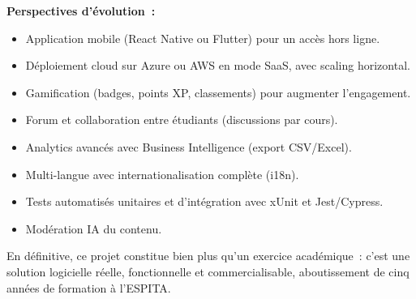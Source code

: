 \textbf{Perspectives d'évolution~:}
\begin{itemize}
  \item Application mobile (React Native ou Flutter) pour un accès hors ligne.
  \item Déploiement cloud sur Azure ou AWS en mode SaaS, avec scaling horizontal.
  \item Gamification (badges, points XP, classements) pour augmenter l'engagement.
  \item Forum et collaboration entre étudiants (discussions par cours).
  \item Analytics avancés avec Business Intelligence (export CSV/Excel).
  \item Multi-langue avec internationalisation complète (i18n).
  \item Tests automatisés unitaires et d'intégration avec xUnit et Jest/Cypress.
  \item Modération \ac{IA} du contenu.
\end{itemize}

\medskip

En définitive, ce projet constitue bien plus qu'un exercice académique~: c'est une
solution logicielle réelle, fonctionnelle et commercialisable, aboutissement de cinq
années de formation à l'ESPITA.
